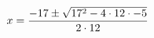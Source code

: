 \documentclass[preview]{standalone}
\begin{document}
\begin{align*}
\special{dvisvgm:raw <g id='unique000'>}x = \frac{-17 \pm \sqrt{17^2 - 4 \cdot 12 \cdot -5}}{2 \cdot 12}\special{dvisvgm:raw </g>}
\end{align*}
\end{document}
